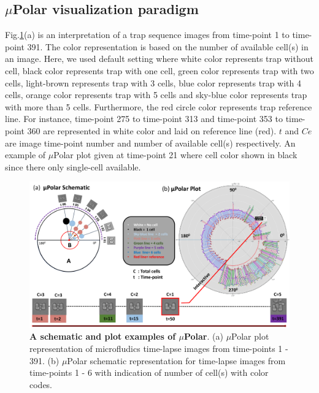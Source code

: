 \documentclass[conference]{IEEEtran}
\begin{document}
\subsection{$\mu$Polar visualization paradigm}

Fig.\ref{fig:polar}(a) is an interpretation of a trap sequence images from time-point 1 to time-point 391. The color representation is based on the number of available cell(s) in an image. Here, we used default setting where white color represents trap without cell, black color represents trap with one cell, green color represents trap with two cells, light-brown represents trap with 3 cells, blue color represents trap with 4 cells, orange color represents trap with 5 cells and sky-blue color represents trap with more than 5 cells. Furthermore, the red circle color represents trap reference line. For instance, time-point 275 to time-point 313 and time-point 353 to time-point 360 are represented in white color and laid on reference line (red). $ t  $ and  $ Ce $  are image time-point number and number of available cell(s) respectively. An example of $\mu$Polar plot given at time-point 21 where cell color shown in black since there only single-cell available. 


\begin{figure}
\centering
\includegraphics[width=\textwidth,height=10 cm]{Patterns/polar.pdf}
\caption{ \textbf{ A schematic and plot examples of $\mu$Polar}. (a) $\mu$Polar plot representation of microfludics time-lapse images from time-points 1 - 391. (b) $\mu$Polar schematic representation for time-lapse images from time-points 1 - 6 with indication of number of cell(s) with color codes.}
\label{fig:polar}
\end{figure}
\end{document}
